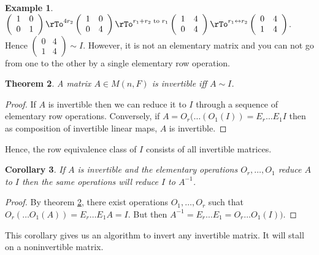 \documentclass[12pt]{amsart}
\newtheorem{theorem}{Theorem}[section]
\newtheorem{corollary}[theorem]{Corollary}
\theoremstyle{definition}
\newtheorem{example}[theorem]{Example}
\begin{document}
\begin{example} $\left(\begin{array}{cc} 1 & 0 \\ 0 & 1 \end{array}\right) \rTo^{4r_2} \left(\begin{array}{cc} 1 & 0 \\ 0 & 4 \end{array}\right) \rTo^{r_1 + r_2 \text{ to } r_1} \left(\begin{array}{cc} 1 & 4 \\ 0 & 4 \end{array}\right) \rTo^{r_1 \leftrightarrow r_2} \left(\begin{array}{cc} 0 & 4 \\ 1 & 4 \end{array}\right)$. Hence $\left(\begin{array}{cc} 0 & 4 \\ 1 & 4 \end{array}\right) \sim I$. However, it is not an elementary matrix and you can not go from one to the other by a single elementary row operation.
\end{example}

\begin{theorem}\label{invertibleequivalentI} A matrix $A \in M(n, F)$ is invertible iff $A \sim I$.
\end{theorem}
\begin{proof} If $A$ is invertible then we can reduce it to $I$ through a sequence of elementary row operations. Conversely, if $A = O_r(\dots (O_1(I)) = E_r \dots E_1 I$ then as composition of invertible linear maps, $A$ is invertible.
\end{proof}

Hence, the row equivalence class of $I$ consists of all invertible matrices.

\begin{corollary} If $A$ is invertible and the elementary operations $O_r, \dots ,O_1$ reduce $A$ to $I$ then the same operations will reduce $I$ to $A^{-1}$.
\end{corollary}
\begin{proof} By theorem \ref{invertibleequivalentI}, there exist operations $O_1, \dots, O_r$ such that $O_r(\dots O_1(A)) = E_r \dots E_1A = I$. But then $A^{-1} = E_r \dots E_1 = O_r\dots O_1(I))$.
\end{proof}

This corollary gives us an algorithm to invert any invertible matrix. It will stall on a noninvertible matrix.
\end{document}
